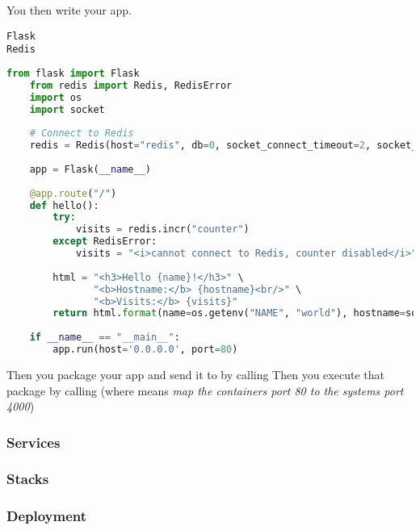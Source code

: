 You then write your app. 
\begin{lstlisting}[caption=requirements.txt]
Flask
Redis
\end{lstlisting}

\begin{lstlisting}[language=python, caption=main.py]
    from flask import Flask
    from redis import Redis, RedisError
    import os
    import socket
    
    # Connect to Redis
    redis = Redis(host="redis", db=0, socket_connect_timeout=2, socket_timeout=2)
    
    app = Flask(__name__)
    
    @app.route("/")
    def hello():
        try:
            visits = redis.incr("counter")
        except RedisError:
            visits = "<i>cannot connect to Redis, counter disabled</i>"
    
        html = "<h3>Hello {name}!</h3>" \
               "<b>Hostname:</b> {hostname}<br/>" \
               "<b>Visits:</b> {visits}"
        return html.format(name=os.getenv("NAME", "world"), hostname=socket.gethostname(), visits=visits)
    
    if __name__ == "__main__":
        app.run(host='0.0.0.0', port=80)
\end{lstlisting}
Then you package your app and send it to  by calling 
Then you execute that package by calling  (where  means \emph{map the containers port 80 to the systems port 4000})


\subsubsection{Services}

\subsubsection{Stacks}

\subsubsection{Deployment}

